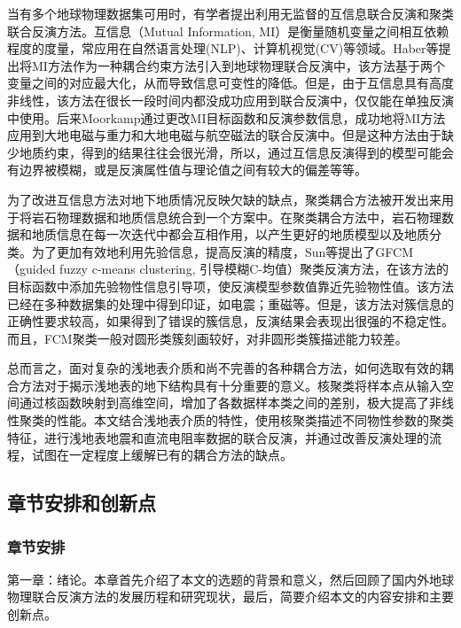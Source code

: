 当有多个地球物理数据集可用时，有学者提出利用无监督的互信息联合反演和聚类联合反演方法。互信息（Mutual Information, MI）是衡量随机变量之间相互依赖程度的度量，常应用在自然语言处理(NLP)、计算机视觉(CV)等领域。Haber等提出将MI方法作为一种耦合约束方法引入到地球物理联合反演中\cite{haber2013model}，该方法基于两个变量之间的对应最大化，从而导致信息可变性的降低。但是，由于互信息具有高度非线性，该方法在很长一段时间内都没成功应用到联合反演中，仅仅能在单独反演中使用。后来Moorkamp通过更改MI目标函数和反演参数信息，成功地将MI方法应用到大地电磁与重力和大地电磁与航空磁法的联合反演中\cite{moorkamp2017integrating}。但是这种方法由于缺少地质约束，得到的结果往往会很光滑，所以，通过互信息反演得到的模型可能会有边界被模糊，或是反演属性值与理论值之间有较大的偏差等等。

为了改进互信息方法对地下地质情况反映欠缺的缺点，聚类耦合方法被开发出来用于将岩石物理数据和地质信息统合到一个方案中。在聚类耦合方法中，岩石物理数据和地质信息在每一次迭代中都会互相作用，以产生更好的地质模型以及地质分类\cite{sun2015multidomain}。为了更加有效地利用先验信息，提高反演的精度，Sun等提出了GFCM（guided fuzzy c-means clustering, 引导模糊C-均值）聚类反演方法，在该方法的目标函数中添加先验物性信息引导项，使反演模型参数值靠近先验物性值。该方法已经在多种数据集的处理中得到印证，如电震\cite{杨博2021基于聚类和多元地质统计学的电}；重磁\cite{sun2016joint}等。但是，该方法对簇信息的正确性要求较高，如果得到了错误的簇信息，反演结果会表现出很强的不稳定性。而且，FCM聚类一般对圆形类簇刻画较好，对非圆形类簇描述能力较差。

总而言之，面对复杂的浅地表介质和尚不完善的各种耦合方法，如何选取有效的耦合方法对于揭示浅地表的地下结构具有十分重要的意义。核聚类将样本点从输入空间通过核函数映射到高维空间，增加了各数据样本类之间的差别，极大提高了非线性聚类的性能。本文结合浅地表介质的特性，使用核聚类描述不同物性参数的聚类特征，进行浅地表地震和直流电阻率数据的联合反演，并通过改善反演处理的流程，试图在一定程度上缓解已有的耦合方法的缺点。

\subsection{章节安排和创新点}

\subsubsection{章节安排}

第一章：绪论。本章首先介绍了本文的选题的背景和意义，然后回顾了国内外地球物理联合反演方法的发展历程和研究现状，最后，简要介绍本文的内容安排和主要创新点。

